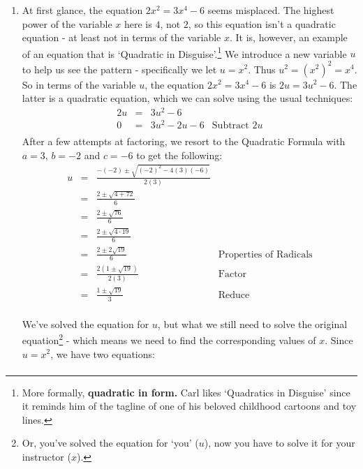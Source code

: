 \documentclass{ximera}
\begin{document}
\begin{example}
\begin{explanation}
\begin{enumerate}
\item At first glance, the equation $2x^2 = 3x^4 - 6$ seems misplaced.  The highest power of the variable $x$ here is $4$, not $2$, so this equation isn't a quadratic equation - at least not in terms of the variable $x$.  It is, however, an example of an equation that is `Quadratic in Disguise'.\footnote{More formally, \textbf{quadratic in form.} Carl likes `Quadratics in Disguise' since it reminds him of the tagline of one of his beloved childhood cartoons and toy lines.} We introduce a new variable $u$ to help us see the pattern - specifically we let $u = x^2$.  Thus $u^2 = (x^2)^2 = x^4$.  So in terms of the variable $u$, the equation $2x^2 = 3x^4 - 6$ is $2u = 3u^2 - 6$.  The latter is a quadratic equation, which we can solve using the usual techniques:\[ \begin{array}{rclr}

2u & = & 3u^2 - 6 & \\

0 & = & 3u^2 - 2u - 6 & \text{Subtract $2u$} \\

\end{array}\] After a few attempts at factoring, we resort to the Quadratic Formula with $a = 3$, $b = -2$ and $c = -6$ to get the following:\[ \begin{array}{rclr}

u & = & \frac{-(-2) \pm \sqrt{(-2)^2 - 4(3)(-6)}}{2(3)} & \\  

& = & \frac{2 \pm \sqrt{4 + 72}}{6} & \\  

& = & \frac{2 \pm \sqrt{76}}{6} & \\  

& = & \frac{2 \pm \sqrt{4 \cdot 19}}{6} & \\  

& = & \frac{2 \pm 2\sqrt{19}}{6} & \text{Properties of Radicals} \\  

& = & \frac{2(1 \pm \sqrt{19})}{2(3)} & \text{Factor} \\  

& = & \frac{1 \pm \sqrt{19}}{3} & \text{Reduce} \\

\end{array} \]

We've solved the equation for $u$, but what we still need to solve the original equation\footnote{Or, you've solved the equation for `you' ($u$), now you have to solve it for your instructor ($x$).} - which means we need to find the corresponding values of $x$.  Since $u = x^2$, we have two equations:\[ \begin{array}{rclr}  


\end{array}\]
\end{enumerate}
\end{explanation}
\end{example}
\end{document}
